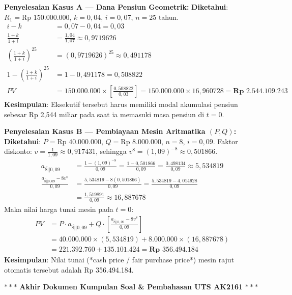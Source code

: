 \documentclass[11pt,a4paper]{article}
\newcommand{\angl}[1]{\overline{#1|}}
\begin{document}
\begin{solusibox}
\textbf{Penyelesaian Kasus A --- Dana Pensiun Geometrik:}
\textbf{Diketahui}: $R_1 = \text{Rp } 150.000.000$, $k = 0{,}04$, $i = 0{,}07$, $n = 25$ tahun.
\begin{align*}
    i - k &= 0{,}07 - 0{,}04 = 0{,}03 \\
    \frac{1+k}{1+i} &= \frac{1{,}04}{1{,}07} \approx 0{,}9719626 \\
    \left(\frac{1+k}{1+i}\right)^{25} &= (0{,}9719626)^{25} \approx 0{,}491178 \\
    1 - \left(\frac{1+k}{1+i}\right)^{25} &= 1 - 0{,}491178 = 0{,}508822 \\
    PV &= 150.000.000 \times \left[ \frac{0{,}508822}{0{,}03} \right] = 150.000.000 \times 16{,}960728 = \mathbf{\text{Rp } 2.544.109.243}
\end{align*}
\textbf{Kesimpulan}: Eksekutif tersebut harus memiliki modal akumulasi pensiun sebesar Rp 2,544 miliar pada saat ia memasuki masa pensiun di $t=0$.

\textbf{Penyelesaian Kasus B --- Pembiayaan Mesin Aritmatika $(P, Q)$:}
\textbf{Diketahui}: $P = \text{Rp } 40.000.000$, $Q = \text{Rp } 8.000.000$, $n = 8$, $i = 0{,}09$.  
Faktor diskonto: $v = \frac{1}{1{,}09} \approx 0{,}917431$, sehingga $v^8 = (1{,}09)^{-8} \approx 0{,}501866$.
\begin{align*}
    a_{\angl{8}|0{,}09} &= \frac{1 - (1{,}09)^{-8}}{0{,}09} = \frac{1 - 0{,}501866}{0{,}09} = \frac{0{,}498134}{0{,}09} \approx 5{,}534819 \\
    \frac{a_{\angl{8}|0{,}09} - 8 v^8}{0{,}09} &= \frac{5{,}534819 - 8(0{,}501866)}{0{,}09} = \frac{5{,}534819 - 4{,}014928}{0{,}09} \\
    &= \frac{1{,}519891}{0{,}09} \approx 16{,}887678
\end{align*}
Maka nilai harga tunai mesin pada $t=0$:
\begin{align*}
    PV &= P \cdot a_{\angl{8}|0{,}09} + Q \cdot \left[ \frac{a_{\angl{8}|0{,}09} - 8 v^8}{0{,}09} \right] \\
    &= 40.000.000 \times (5{,}534819) + 8.000.000 \times (16{,}887678) \\
    &= 221.392.760 + 135.101.424 = \mathbf{\text{Rp } 356.494.184}
\end{align*}
\textbf{Kesimpulan}: Nilai tunai (*cash price / fair purchase price*) mesin rajut otomatis tersebut adalah Rp 356.494.184.
\end{solusibox}

\vfill
\begin{center}
    \small\color{gray}
    $\ast\ast\ast$ \textbf{Akhir Dokumen Kumpulan Soal \& Pembahasan UTS AK2161} $\ast\ast\ast$
\end{center}
\end{document}
